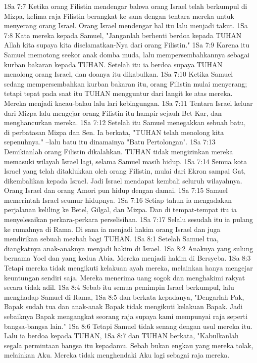 1Sa 7:7  Ketika orang Filistin mendengar bahwa orang Israel telah berkumpul di Mizpa, kelima raja Filistin berangkat ke sana dengan tentara mereka untuk menyerang orang Israel. Orang Israel mendengar hal itu lalu menjadi takut.
1Sa 7:8  Kata mereka kepada Samuel, "Janganlah berhenti berdoa kepada TUHAN Allah kita supaya kita diselamatkan-Nya dari orang Filistin."
1Sa 7:9  Karena itu Samuel memotong seekor anak domba muda, lalu mempersembahkannya sebagai kurban bakaran kepada TUHAN. Setelah itu ia berdoa supaya TUHAN menolong orang Israel, dan doanya itu dikabulkan.
1Sa 7:10  Ketika Samuel sedang mempersembahkan kurban bakaran itu, orang Filistin mulai menyerang; tetapi tepat pada saat itu TUHAN mengguntur dari langit ke atas mereka. Mereka menjadi kacau-balau lalu lari kebingungan.
1Sa 7:11  Tentara Israel keluar dari Mizpa lalu mengejar orang Filistin itu hampir sejauh Bet-Kar, dan menghancurkan mereka.
1Sa 7:12  Setelah itu Samuel menegakkan sebuah batu, di perbatasan Mizpa dan Sen. Ia berkata, "TUHAN telah menolong kita sepenuhnya." --lalu batu itu dinamainya "Batu Pertolongan".
1Sa 7:13  Demikianlah orang Filistin dikalahkan. TUHAN tidak mengizinkan mereka memasuki wilayah Israel lagi, selama Samuel masih hidup.
1Sa 7:14  Semua kota Israel yang telah ditaklukkan oleh orang Filistin, mulai dari Ekron sampai Gat, dikembalikan kepada Israel. Jadi Israel mendapat kembali seluruh wilayahnya. Orang Israel dan orang Amori pun hidup dengan damai.
1Sa 7:15  Samuel memerintah Israel seumur hidupnya.
1Sa 7:16  Setiap tahun ia mengadakan perjalanan keliling ke Betel, Gilgal, dan Mizpa. Dan di tempat-tempat itu ia menyelesaikan perkara-perkara perselisihan.
1Sa 7:17  Selalu sesudah itu ia pulang ke rumahnya di Rama. Di sana ia menjadi hakim orang Israel dan juga mendirikan sebuah mezbah bagi TUHAN.
1Sa 8:1  Setelah Samuel tua, diangkatnya anak-anaknya menjadi hakim di Israel.
1Sa 8:2  Anaknya yang sulung bernama Yoel dan yang kedua Abia. Mereka menjadi hakim di Bersyeba.
1Sa 8:3  Tetapi mereka tidak mengikuti kelakuan ayah mereka, melainkan hanya mengejar keuntungan sendiri saja. Mereka menerima uang sogok dan menghakimi rakyat secara tidak adil.
1Sa 8:4  Sebab itu semua pemimpin Israel berkumpul, lalu menghadap Samuel di Rama,
1Sa 8:5  dan berkata kepadanya, "Dengarlah Pak, Bapak sudah tua dan anak-anak Bapak tidak mengikuti kelakuan Bapak. Jadi sebaiknya Bapak mengangkat seorang raja supaya kami mempunyai raja seperti bangsa-bangsa lain."
1Sa 8:6  Tetapi Samuel tidak senang dengan usul mereka itu. Lalu ia berdoa kepada TUHAN,
1Sa 8:7  dan TUHAN berkata, "Kabulkanlah segala permintaan bangsa itu kepadamu. Sebab bukan engkau yang mereka tolak, melainkan Aku. Mereka tidak menghendaki Aku lagi sebagai raja mereka.
